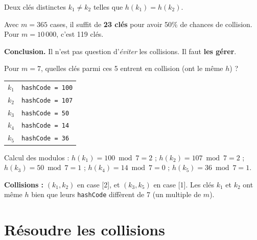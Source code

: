 \documentclass[11pt,a4paper]{article}
\begin{document}
\begin{infobox}[Collision]
Deux clés distinctes $k_1 \neq k_2$ telles que $h(k_1) = h(k_2)$.
\end{infobox}

\begin{attentionbox}
Avec $m = 365$ cases, il suffit de \textbf{23 clés} pour avoir 50\% de chances de collision. Pour $m = 10\,000$, c'est 119 clés.

\medskip
\textbf{Conclusion.} Il n'est pas question d'\emph{éviter} les collisions. Il faut \textbf{les gérer}.
\end{attentionbox}

\begin{appliboxQ}
Pour $m = 7$, quelles clés parmi ces 5 entrent en collision (ont le même $h$) ?

\medskip
\begin{tabular}{@{}ll@{}}
$k_1$ & \texttt{hashCode = 100} \\
$k_2$ & \texttt{hashCode = 107} \\
$k_3$ & \texttt{hashCode = 50} \\
$k_4$ & \texttt{hashCode = 14} \\
$k_5$ & \texttt{hashCode = 36} \\
\end{tabular}
\end{appliboxQ}

\begin{appliboxR}[Réponse]
Calcul des modulos : $h(k_1) = 100 \bmod 7 = 2$ ; $h(k_2) = 107 \bmod 7 = 2$ ; $h(k_3) = 50 \bmod 7 = 1$ ; $h(k_4) = 14 \bmod 7 = 0$ ; $h(k_5) = 36 \bmod 7 = 1$.

\medskip
\textbf{Collisions :} $(k_1, k_2)$ en case [2], et $(k_3, k_5)$ en case [1]. Les clés $k_1$ et $k_2$ ont même $h$ bien que leurs \texttt{hashCode} diffèrent de 7 (un multiple de $m$).
\end{appliboxR}

\newpage


\part{Résoudre les collisions}

\end{document}
